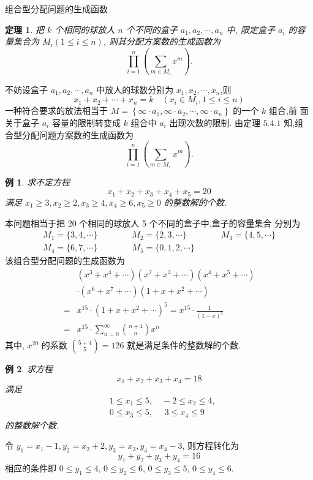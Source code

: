 \documentclass[punct]{ctexbeamer}
\newtheorem{thm}{定理}[section]
\newtheorem{ex}{例}[section]
\def\pf{\noindent {\bf 证明\ }}
\def\sol{\noindent {\bf 解\ }}
\begin{document}
\begin{frame}{组合型分配问题的生成函数}
	\begin{thm}
		把 $k$ 个相同的球放人 $n$ 个不同的盒子 $a_{1}, a_{2}, \cdots, a_{n}$ 中, 限定盒子 $a_{i}$ 的容量集合为 $M_{i}(1 \leqslant i \leqslant n)$, 则其分配方案数的生成函数为
		$$
		\prod_{i=1}^{n}\left(\sum_{m \in M_{i}} x^{m}\right).
		$$
	\end{thm}
\pause
\pf 不妨设盒子 $a_{1}, a_{2}, \cdots, a_{n}$ 中放人的球数分别为 $x_{1}, x_{2}, \cdots, x_{n}$,则
$$
x_{1}+x_{2}+\cdots+x_{n}=k \quad\left(x_{i} \in M_{i}, 1 \leqslant i \leqslant n\right)
$$
一种符合要求的放法相当于 ${M}=\left\{\infty \cdot a_{1}, \infty \cdot a_{2}, \cdots, \infty \cdot a_{n}\right\}$ 的一个 $k$ 组合,前 面关于盒子 $a_{i}$ 容量的限制转变成 $k$ 组合中 $a_{i}$ 出现次数的限制. 由定理 $5.4 .1$ 知,组 合型分配问题方案数的生成函数为
$$
\prod_{i=1}^{n}\left(\sum_{m \in M,} x^{m}\right).
$$

\end{frame}

\begin{frame}
	\begin{ex}
		求不定方程
		$$
		x_{1}+x_{2}+x_{3}+x_{4}+x_{5}=20
		$$
		满足
		$x_{1} \geqslant 3, x_{2} \geqslant 2, x_{3} \geqslant 4, x_{4} \geqslant 6, x_{5} \geqslant 0$
		的整数解的个数.
	\end{ex}
\pause
\sol 本问题相当于把 20 个相同的球放人 5 个不同的盒子中,盒子的容量集合 分别为
$$
\begin{array}{l}
{M}_{1}=\{3,4, \cdots\} \qquad\qquad
{M}_{2}=\{2,3, \cdots\} \qquad\qquad
{M}_{3}=\{4,5, \cdots\}\\
{M}_{4}=\{6,7, \cdots\} \qquad\qquad
{M}_{5}=\{0,1,2, \cdots\}
\end{array}
$$
该组合型分配问题的生成函数为
$$
\begin{aligned}
&\left(x^{3}+x^{4}+\cdots\right)\left(x^{2}+x^{3}+\cdots\right)\left(x^{4}+x^{5}+\cdots\right)\\
&\cdot\left(x^{6}+x^{7}+\cdots\right)\left(1+x+x^{2}+\cdots\right) \\
=&x^{15} \cdot\left(1+x+x^{2}+\cdots\right)^{5}
=x^{15} \cdot \frac{1}{(1-x)^{5}} \\
=&x^{15} \cdot \sum_{n=0}^{\infty}\binom{n+4}{n} x^{n}
\end{aligned}
$$
其中, $x^{20}$ 的系数 $\binom{5+4}{5}=126$ 就是满足条件的整数解的个数.
\end{frame}

\begin{frame}
	\begin{ex}
		求方程 $$x_{1}+x_{2}+x_{3}+x_{4}=18$$ 满足
		\begin{align*}
		& 1 \leq x_{1} \leq 5, \quad  -2 \leq x_{2} \leq 4,\\
		& 0 \leq x_{3} \leq 5, \quad \,  \,3 \leq x_{4} \leq 9
		\end{align*}
		的整数解个数.
	\end{ex}
\pause
\sol 令 $y_{1}=x_{1}-1, y_{2}=x_{2}+2, y_{3}=x_{3}, y_{4}=x_{4}-3$, 则方程转化为
$$
y_{1}+y_{2}+y_{3}+y_{4}=16
$$
相应的条件即 $0 \leq y_{1} \leq 4$, $0 \leq y_{2} \leq 6$, $0 \leq y_{3} \leq 5$, $0 \leq y_{4} \leq 6$.

\end{frame}
\end{document}
